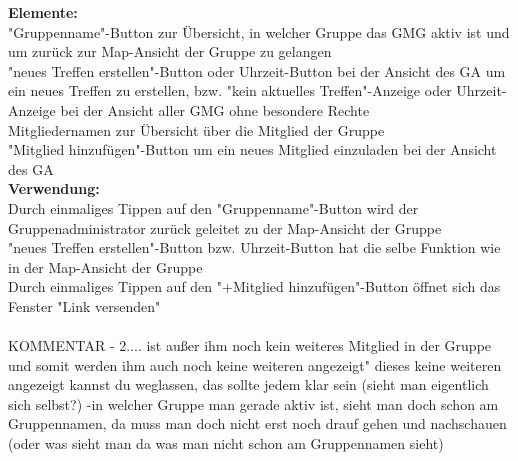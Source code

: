 \textbf{Elemente:}\\
"Gruppenname"-Button zur Übersicht, in welcher Gruppe das GMG aktiv ist und um zurück zur Map-Ansicht der Gruppe zu gelangen\\
"neues Treffen erstellen"-Button oder Uhrzeit-Button bei der Ansicht des GA um ein neues Treffen zu erstellen, bzw. "kein aktuelles Treffen"-Anzeige oder Uhrzeit-Anzeige bei der Ansicht aller GMG ohne besondere Rechte\\
Mitgliedernamen zur Übersicht über die Mitglied der Gruppe\\
"Mitglied hinzufügen"-Button um ein neues Mitglied einzuladen bei der Ansicht des GA\\
\textbf{Verwendung:}\\
Durch einmaliges Tippen auf den "Gruppenname"-Button wird der Gruppenadministrator zurück geleitet zu der Map-Ansicht der Gruppe\\
"neues Treffen erstellen"-Button bzw. Uhrzeit-Button hat die selbe Funktion wie in der Map-Ansicht der Gruppe\\
Durch einmaliges Tippen auf den "+Mitglied hinzufügen"-Button öffnet sich das Fenster "Link versenden"\\ \\

KOMMENTAR
- 2.... ist außer ihm noch kein weiteres Mitglied in der Gruppe und somit werden ihm auch noch keine weiteren angezeigt" dieses keine weiteren angezeigt kannst du weglassen, das sollte jedem klar sein (sieht man eigentlich sich selbst?)
-in welcher Gruppe man gerade aktiv ist, sieht man doch schon am Gruppennamen, da muss man doch nicht erst noch drauf gehen und nachschauen (oder was sieht man da was man nicht schon am Gruppennamen sieht)


